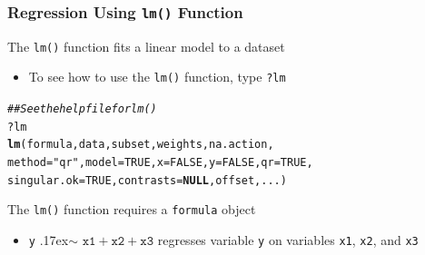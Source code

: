 \documentclass{beamer}\usepackage[]{graphicx}\usepackage[]{color}
\makeatletter
\newcommand{\hlnum}[1]{\textcolor[rgb]{0.686,0.059,0.569}{#1}}%
\newcommand{\hlstr}[1]{\textcolor[rgb]{0.192,0.494,0.8}{#1}}%
\newcommand{\hlcom}[1]{\textcolor[rgb]{0.678,0.584,0.686}{\textit{#1}}}%
\newcommand{\hlopt}[1]{\textcolor[rgb]{0,0,0}{#1}}%
\newcommand{\hlstd}[1]{\textcolor[rgb]{0.345,0.345,0.345}{#1}}%
\newcommand{\hlkwa}[1]{\textcolor[rgb]{0.161,0.373,0.58}{\textbf{#1}}}%
\newcommand{\hlkwc}[1]{\textcolor[rgb]{0.333,0.667,0.333}{#1}}%
\newcommand{\hlkwd}[1]{\textcolor[rgb]{0.737,0.353,0.396}{\textbf{#1}}}%
\newenvironment{kframe}{%
 \def\at@end@of@kframe{}%
 \ifinner\ifhmode%
  \def\at@end@of@kframe{\end{minipage}}%
  \begin{minipage}{\columnwidth}%
 \fi\fi%
 \def\FrameCommand##1{\hskip\@totalleftmargin \hskip-\fboxsep
 \colorbox{shadecolor}{##1}\hskip-\fboxsep
     \hskip-\linewidth \hskip-\@totalleftmargin \hskip\columnwidth}%
 \MakeFramed {\advance\hsize-\width
   \@totalleftmargin\z@ \linewidth\hsize
   \@setminipage}}%
 {\par\unskip\endMakeFramed%
 \at@end@of@kframe}
\newenvironment{knitrout}{}{} %
\makeatother
\begin{document}
\begin{frame}[fragile]\frametitle{Regression Using \texttt{lm()} Function}
    The \texttt{lm()} function fits a linear model to a dataset
    \begin{itemize}
        \item To see how to use the \texttt{lm()} function, type \texttt{?lm}
    \end{itemize}
\begin{knitrout}\footnotesize
{}\color{fgcolor}\begin{kframe}
\begin{alltt}
\hlcom{## See the help file for lm()}
\hlopt{?}\hlstd{lm}
\hlkwd{lm}\hlstd{(formula, data, subset, weights, na.action,}
   \hlkwc{method} \hlstd{=} \hlstr{"qr"}\hlstd{,} \hlkwc{model} \hlstd{=} \hlnum{TRUE}\hlstd{,} \hlkwc{x} \hlstd{=} \hlnum{FALSE}\hlstd{,} \hlkwc{y} \hlstd{=} \hlnum{FALSE}\hlstd{,} \hlkwc{qr} \hlstd{=} \hlnum{TRUE}\hlstd{,}
   \hlkwc{singular.ok} \hlstd{=} \hlnum{TRUE}\hlstd{,} \hlkwc{contrasts} \hlstd{=} \hlkwa{NULL}\hlstd{, offset, ...)}
\end{alltt}
\end{kframe}
\end{knitrout}
    \vspace{2ex}
    The \texttt{lm()} function requires a \texttt{formula} object
    \begin{itemize}
        \item \texttt{y} {\raise.17ex\hbox{$\scriptstyle\mathtt{\sim}$}} $\mathtt{x1 + x2 + x3}$ regresses variable \texttt{y} on variables \texttt{x1}, \texttt{x2}, and \texttt{x3}
    \end{itemize}
\end{frame}
\end{document}
